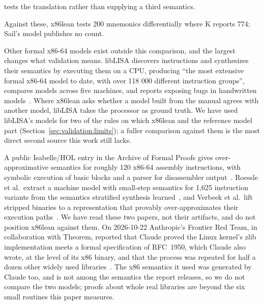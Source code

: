 \documentclass[runningheads]{llncs}
\newcommand{\src}[1]{}  %
\begin{document}
tests the translation rather than supplying a third semantics.
\src{docs/TACAS-G1-POSITIONING.md 1c.5 and 1c.7}
Against these, x86lean tests 200 mnemonics differentially where K reports 774; Sail's model publishes no count.
\src{docs/CLAIMS.tsv[coverage\_mnemonics, k\_mnemonics]; docs/TACAS-G1-POSITIONING.md, the scale row and 1d; x86isa machine/catalogue-doc.lisp at acl2 c8897a34;
199 is derived by scripts/claimed\_forms.py into COVERAGE.md, and this copy is checked against the row (D231); docs/DECISIONS.md D220}
Other formal x86-64 models exist outside this comparison, and the largest changes what validation
means. libLISA discovers instructions and synthesizes their semantics by executing them on a CPU,
producing ``the most extensive formal x86-64 model to date, with over 118 000 different instruction
groups'', compares models across five machines, and reports exposing bugs in handwritten
models~\cite{liblisa}. Where x86lean asks whether a model built from the manual agrees with another
model, libLISA takes the processor as ground truth.
We have used libLISA's models for two of the rules on which x86lean and the reference model part
(Section~\ref{sec:validation:limits}); a fuller comparison against them is the most direct second source this work
still lacks.
\src{docs/CLAIMS.tsv[liblisa\_groups]; docs/LIBLISA-HARDWARE-CHECK-2026-09-12.md; docs/DECISIONS.md D221; the quoted ``118 000'' keeps libLISA's own spacing, which the prose check reads since D235}
A public Isabelle/HOL entry in the Archive of
Formal Proofs gives over-approximative semantics for roughly 120 x86-64 assembly instructions, with
symbolic execution of basic blocks and a parser for disassembler output~\cite{afp-x86}. Roessle et al.\ extract a machine model with small-step semantics for 1{,}625 instruction variants from the semantics
stratified synthesis learned~\cite{roessle-bigstep}, and Verbeek et al.\ lift stripped binaries to a representation that
provably over-approximates their execution paths~\cite{verbeek-lifting}. We have read these two papers, not their
artifacts, and do not position x86lean against them.
On 2026-10-22 Anthropic's Frontier Red Team, in collaboration with Theorem, reported that Claude proved the Linux
kernel's zlib implementation meets a formal specification of RFC~1950, which Claude also wrote, at the level of its x86
binary, and that the process was repeated for half a dozen other widely used libraries~\cite{anthropic-fv}. The x86
semantics it used was generated by Claude too, and is not among the semantics the report releases, so we do not compare
the two models; proofs about whole real libraries are beyond the six small routines this paper measures.
\end{document}
